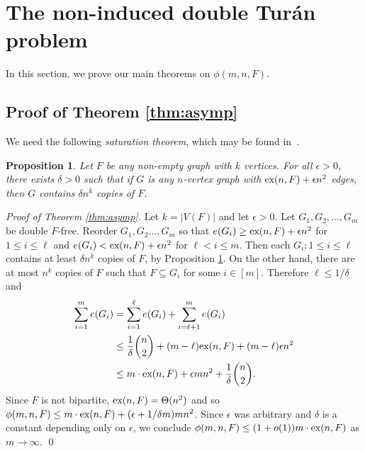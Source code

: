 \documentclass[12pt]{article}
\newtheorem{proposition}[theorem]{Proposition}
\newcommand*{\ex}{\textnormal{ex}}
\begin{document}
\section{The non-induced double Tur\'{a}n problem}

In this section, we prove our main theorems on $\phi(m, n, F)$. 

\subsection{Proof of Theorem \ref{thm:asymp}}

We need the following \textit{saturation theorem}, which may be found in~\cite{ErdosSimonovits1983}.

\begin{proposition}\label{thm:sat}
Let $F$ be any non-empty graph with $k$ vertices. For all $\epsilon > 0$, there exists $\delta > 0$ such that if $G$ is any $n$-vertex graph with $\ex(n,F) + \epsilon n^2$ edges, then  $G$ contains $\delta n^k$ copies of $F$. 
\end{proposition}

\textit{Proof of Theorem \ref{thm:asymp}.}
  Let $k = |V(F)|$ and let $\epsilon > 0$. Let $G_1,G_2,\dots,G_m$ be double $F$-free. 
  Reorder $G_1,G_2 \ldots, G_m$ so that 
  $e(G_i) \geq \ex(n,F) + \epsilon n^2$ for $1 \leq i \leq \ell$ and $e(G_i) <\ex(n,F) + \epsilon n^2$ for $\ell < i \leq m$. Then each $G_i : 1 \leq i \leq \ell$ contains at least $\delta n^k$ copies of $F$, by Proposition \ref{thm:sat}. On the other hand, there are at most $n^k$ copies of $F$ 
  such that $F \subseteq G_i$ for some $i \in [m]$. 
  Therefore $\ell \leq 1/\delta$ and
  \begin{align*}
    \sum_{i = 1}^m e(G_i) 
    &= \sum_{i = 1}^{\ell} e(G_i) + \sum_{i =\ell + 1}^m e(G_i) \\
    &\leq \frac{1}{\delta}\binom{n}{2} + (m - \ell)\ex(n,F) + (m - \ell) \epsilon n^2 \\
    &\leq m \cdot \ex(n,F) + \epsilon m n^2 + \frac{1}{\delta}\binom{n}{2}.
  \end{align*}
Since $F$ is not bipartite, $\ex(n,F) = \Theta(n^2)$ and so $\phi(m, n, F) \leq m \cdot \ex(n,F) + (\epsilon + 1/\delta m)mn^2$. Since $\epsilon$ was arbitrary and $\delta$ is a constant depending only on $\epsilon$, 
we conclude $\phi(m, n, F) \leq (1 + o(1))m \cdot \ex(n,F)$ as $m \rightarrow \infty$. \qed
\end{document}
